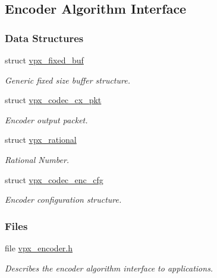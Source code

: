 \hypertarget{group__encoder}{\subsection{\-Encoder \-Algorithm \-Interface}
\label{group__encoder}
}
\subsubsection*{\-Data \-Structures}
\begin{DoxyCompactItemize}
\item 
struct \hyperlink{structvpx__fixed__buf}{vpx\-\_\-fixed\-\_\-buf}
\begin{DoxyCompactList}\small\item\em \-Generic fixed size buffer structure. \end{DoxyCompactList}\item 
struct \hyperlink{structvpx__codec__cx__pkt}{vpx\-\_\-codec\-\_\-cx\-\_\-pkt}
\begin{DoxyCompactList}\small\item\em \-Encoder output packet. \end{DoxyCompactList}\item 
struct \hyperlink{structvpx__rational}{vpx\-\_\-rational}
\begin{DoxyCompactList}\small\item\em \-Rational \-Number. \end{DoxyCompactList}\item 
struct \hyperlink{structvpx__codec__enc__cfg}{vpx\-\_\-codec\-\_\-enc\-\_\-cfg}
\begin{DoxyCompactList}\small\item\em \-Encoder configuration structure. \end{DoxyCompactList}\end{DoxyCompactItemize}
\subsubsection*{\-Files}
\begin{DoxyCompactItemize}
\item 
file \hyperlink{vpx__encoder_8h}{vpx\-\_\-encoder.\-h}
\begin{DoxyCompactList}\small\item\em \-Describes the encoder algorithm interface to applications. \end{DoxyCompactList}\end{DoxyCompactItemize}
